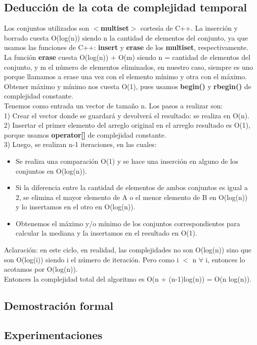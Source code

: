 \subsection{Deducción de la cota de complejidad temporal}
Los conjuntos utilizados son  \textbf{$<$multiset$>$} cortesía de C++. La inserción y borrado cuesta O(log(n)) siendo n la cantidad de elementos del conjunto, ya que usamos las funciones de C++: \textbf{insert} y \textbf{erase} de los \textbf{multiset}, respectivamente. La función \textbf{erase} cuesta O(log(n)) + O(m) siendo n = cantidad de elementos del conjunto, y m el número de elementos eliminados, en nuestro caso, siempre es uno porque llamamos a erase una vez con el elemento mínimo y otra con el máximo.\\
Obtener máximo y mínimo nos cuesta O(1), pues usamos \textbf{begin()} y \textbf{rbegin()} de complejidad constante.  \\

Tenemos como entrada un vector de tamaño n. Los pasos a realizar son: \\

1) Crear el vector donde se guardará y devolverá el resultado: se realiza en O(n). \\

2) Insertar el primer elemento del arreglo original en el arreglo resultado es O(1), porque usamos \textbf{operator[]} de complejidad constante. \\

3) Luego, se realizan n-1 iteraciones, en las cuales: \\

\begin{itemize}
\item Se realiza una comparación O(1) y se hace una inserción en alguno de los conjuntos en O(log(n)).
\item Si la diferencia entre la cantidad de elementos de ambos conjuntos es igual a 2, se elimina el mayor elemento de A o el menor elemento de B en O(log(n)) y lo insertamos en el otro en O(log(n)).
\item Obtenemos el máximo y/o mínimo de los conjuntos correspondientes para calcular la mediana y la insertamos en el resultado en O(1).
\end{itemize}
Aclaración: en este ciclo, en realidad, las complejidades no son O(log(n)) sino que son O(log(i)) siendo i el número de iteración. Pero como i $<$ n $\forall$ i, entonces lo acotamos por O(log(n)). \\

Entonces la complejidad total del algoritmo es O(n + (n-1)log(n)) = O(n log(n)).

\subsection{Demostración formal}
\subsection{Experimentaciones}



